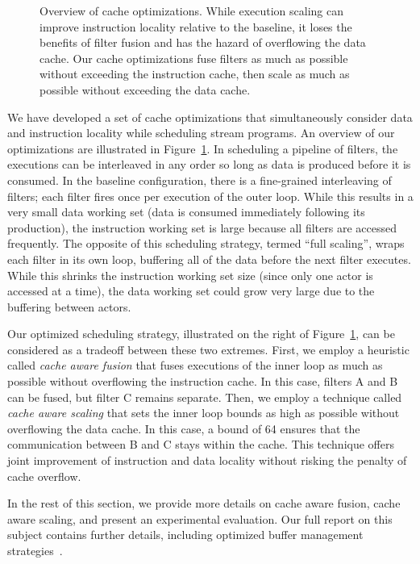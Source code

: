 \begin{figure}[t]
\centering
{}
\caption[Overview of cache optimizations]{Overview of cache 
optimizations.  While execution scaling can improve instruction
locality relative to the baseline, it loses the benefits of filter
fusion and has the hazard of overflowing the data cache.  Our cache
optimizations fuse filters as much as possible without exceeding the
instruction cache, then scale as much as possible without exceeding
the data cache.\protect\label{fig:cacheopt}}
\end{figure}

We have developed a set of cache optimizations that simultaneously
consider data and instruction locality while scheduling stream
programs.  An overview of our optimizations are illustrated in
Figure~\ref{fig:cacheopt}.  In scheduling a pipeline of filters, the
executions can be interleaved in any order so long as data is produced
before it is consumed.  In the baseline configuration, there is a
fine-grained interleaving of filters; each filter fires once per
execution of the outer loop.  While this results in a very small data
working set (data is consumed immediately following its production),
the instruction working set is large because all filters are accessed
frequently.  The opposite of this scheduling strategy, termed ``full
scaling'', wraps each filter in its own loop, buffering all of the
data before the next filter executes.  While this shrinks the
instruction working set size (since only one actor is accessed at a
time), the data working set could grow very large due to the buffering
between actors.

Our optimized scheduling strategy, illustrated on the right of
Figure~\ref{fig:cacheopt}, can be considered as a tradeoff between
these two extremes.  First, we employ a heuristic called {\it cache
aware fusion} that fuses executions of the inner loop as much as
possible without overflowing the instruction cache.  In this case,
filters A and B can be fused, but filter C remains separate.  Then, we
employ a technique called {\it cache aware scaling} that sets the
inner loop bounds as high as possible without overflowing the data
cache.  In this case, a bound of 64 ensures that the communication
between B and C stays within the cache.  This technique offers joint
improvement of instruction and data locality without risking the
penalty of cache overflow.

In the rest of this section, we provide more details on cache aware
fusion, cache aware scaling, and present an experimental evaluation.
Our full report on this subject contains further details, including
optimized buffer management
strategies~\cite{sermulins:lctes:2005,sermulins-thesis}.

